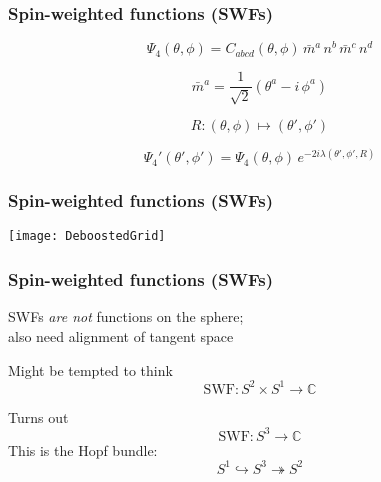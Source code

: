 \documentclass[12pt,xcolor={dvipsnames}]{beamer}
\begin{document}
\begin{frame}
  \frametitle{Spin-weighted functions (SWFs)}
  \begin{equation*}
    \Psi_{4}(\theta, \phi) = C_{abcd}(\theta, \phi)\, \bar{m}^{a}\,
    n^{b}\, \bar{m}^{c}\, n^{d}
  \end{equation*}

  \pause
  \begin{equation*}
    \bar{m}^{a} = \frac{1}{\sqrt{2}} ( \theta^{a} - i\, \phi^{a} )
  \end{equation*}

  \pause
  \vspace{0.2in}
  \begin{equation*}
    R: (\theta, \phi) \mapsto (\theta', \phi')
  \end{equation*}

  \begin{equation*}
    \Psi_{4}'(\theta', \phi') = \Psi_{4}(\theta, \phi)\,
    e^{-2i\lambda(\theta', \phi', R)}
  \end{equation*}
\end{frame}

\begin{frame}
  \frametitle{Spin-weighted functions (SWFs)}
  \begin{center}
    \texttt{[image: DeboostedGrid]}
  \end{center}
\end{frame}

\begin{frame}
  \frametitle{Spin-weighted functions (SWFs)}
  \begin{center}
    SWFs \emph{are not} functions on the sphere; \\[5pt]
    also need alignment of tangent space
  \end{center}
  
  \pause
  \vspace{0.3in}
  Might be tempted to think
  \begin{equation*}
    \text{SWF} : S^{2} \times S^{1} \to \mathbb{C}
  \end{equation*}

  \pause
  Turns out
  \begin{equation*}
    \text{SWF} : S^{3} \to \mathbb{C}
  \end{equation*}
  This is the Hopf bundle:
  \begin{equation*}
    S^{1} \hookrightarrow S^{3} \twoheadrightarrow S^{2}
  \end{equation*}
\end{frame}
\end{document}

